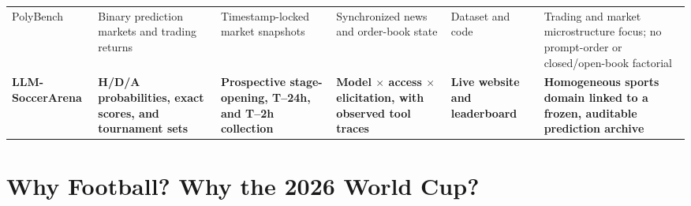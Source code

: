 \documentclass[sigconf,review]{acmart}
\newcommand{\arena}{\mbox{LLM-SoccerArena}\xspace}
\begin{document}
\begin{table}[t]
\begin{tabularx}{\textwidth}{@{}p{2.15cm}p{2.45cm}p{2.75cm}p{2.85cm}p{1.65cm}X@{}}
    PolyBench \citep{polybench} & Binary prediction markets and trading returns & Timestamp-locked
    market snapshots & Synchronized news and order-book state & Dataset and code & Trading and market
    microstructure focus; no prompt-order or closed/open-book factorial \\
    \textbf{\arena} & \textbf{H/D/A probabilities, exact scores, and tournament sets} &
    \textbf{Prospective stage-opening, T--24h, and T--2h collection} & \textbf{Model $\times$ access
    $\times$ elicitation, with observed tool traces} & \textbf{Live website and leaderboard} &
    \textbf{Homogeneous sports domain linked to a frozen, auditable prediction archive} \\
    \hline
  \end{tabularx}
\end{table}

\section{Why Football? Why the 2026 World Cup?}
\end{document}

